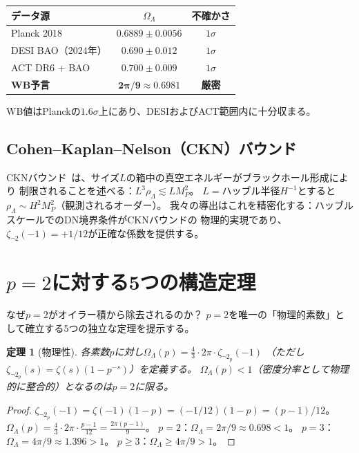 \documentclass[12pt,a4paper]{article}
\newtheorem{theorem}{定理}[section]
\theoremstyle{definition}
\newcommand{\OmL}{\Omega_\Lambda}
\newcommand{\zetanot}{\zeta_{\neg 2}}
\begin{document}
\begin{center}
\begin{tabular}{lcc}
\toprule
\textbf{データ源} & $\OmL$ & \textbf{不確かさ} \\
\midrule
Planck 2018        & $0.6889\pm 0.0056$  & $1\sigma$ \\
DESI BAO（2024年） & $0.690\pm 0.012$    & $1\sigma$ \\
ACT DR6 + BAO      & $0.700\pm 0.009$    & $1\sigma$ \\
\textbf{WB予言}    & $\mathbf{2\pi/9\approx 0.6981}$ & \textbf{厳密} \\
\bottomrule
\end{tabular}
\end{center}

WB値はPlanckの$1.6\sigma$上にあり、DESIおよびACT範囲内に十分収まる。

\subsection{Cohen--Kaplan--Nelson（CKN）バウンド}

CKNバウンド~\cite{CKN}は、サイズ$L$の箱中の真空エネルギーがブラックホール形成により
制限されることを述べる：$L^3\rho_\Lambda\lesssim LM_P^2$。
$L=$ハッブル半径$H^{-1}$とすると$\rho_\Lambda\sim H^2M_P^2$（観測されるオーダー）。
我々の導出はこれを精密化する：ハッブルスケールでのDN境界条件がCKNバウンドの
物理的実現であり、$\zetanot(-1)=+1/12$が正確な係数を提供する。

\section{$p=2$に対する5つの構造定理}\label{sec:p2}

なぜ$p=2$がオイラー積から除去されるのか？
$p=2$を唯一の「物理的素数」として確立する5つの独立な定理を提示する。

\begin{theorem}[物理性]\label{thm:phys}
各素数$p$に対し$\Omega_\Lambda(p)=\frac{4}{3}\cdot 2\pi\cdot\zetanot_p(-1)$
（ただし$\zetanot_p(s)=\zeta(s)(1-p^{-s})$）を定義する。
$\Omega_\Lambda(p)<1$（密度分率として物理的に整合的）となるのは$p=2$に限る。
\end{theorem}

\begin{proof}
$\zetanot_p(-1)=\zeta(-1)(1-p)=(-1/12)(1-p)=(p-1)/12$。
$\Omega_\Lambda(p)=\frac{4}{3}\cdot 2\pi\cdot\frac{p-1}{12}=\frac{2\pi(p-1)}{9}$。
$p=2$：$\Omega_\Lambda=2\pi/9\approx 0.698<1$。
$p=3$：$\Omega_\Lambda=4\pi/9\approx 1.396>1$。
$p\ge 3$：$\Omega_\Lambda\ge 4\pi/9>1$。
\end{proof}
\end{document}
